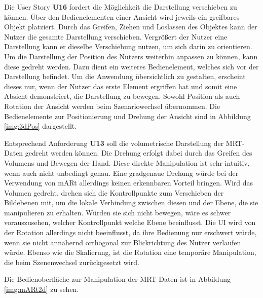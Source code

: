 Die User Story \textbf{U16} fordert die Möglichkeit die Darstellung verschieben zu können. %
Über den Bedienelementen einer Ansicht wird jeweils ein greifbares Objekt platziert. Durch das Greifen, Ziehen und Loslassen des Objektes kann der Nutzer die gesamte Darstellung verschieben. %
Vergrößert der Nutzer eine Darstellung kann er dieselbe Verschiebung nutzen, um sich darin zu orientieren. 
Um die Darstellung der Position des Nutzers weiterhin anpassen zu können, kann diese gedreht werden. Dazu dient ein weiteres Bedienelement, welches sich vor der Darstellung befindet. Um die Anwendung übersichtlich zu gestalten, erscheint dieses nur, wenn der Nutzer das erste Element ergriffen hat und somit eine Absicht demonstriert, die Darstellung zu bewegen. 
Sowohl Position als auch Rotation der Ansicht werden beim Szenariowechsel übernommen.
Die Bedienelemente zur Positionierung und Drehung der Ansicht sind in Abbildung \ref{img:3dPos} dargestellt. 

Entsprechend Anforderung \textbf{U13} soll die volumetrische Darstellung der MRT-Daten gedreht werden können. 
Die Drehung erfolgt dabei durch das Greifen des Volumens und Bewegen der Hand. Diese direkte Manipulation ist sehr intuitiv, wenn auch nicht unbedingt genau. Eine gradgenaue Drehung würde bei der Verwendung von mARt allerdings keinen erkennbaren Vorteil bringen. 
Wird das Volumen gedreht, drehen sich die Kontrollpunkte zum Verschieben der Bildebenen mit, um die lokale Verbindung zwischen diesen und der Ebene, die sie manipulieren zu erhalten. Würden sie sich nicht bewegen, wäre es schwer vorauszusehen, welcher Kontrollpunkt welche Ebene beeinflusst. 
Die UI wird von der Rotation allerdings nicht beeinflusst, da ihre Bedienung nur erschwert würde, wenn sie nicht annähernd orthogonal zur Blickrichtung des Nutzer verlaufen würde. 
Ebenso wie die Skalierung, ist die Rotation eine temporäre Manipulation, die beim Szenenwechsel zurückgesetzt wird.


Die Bedienoberfläche zur Manipulation der MRT-Daten ist in Abbildung \ref{img:mARt2d} zu sehen.

